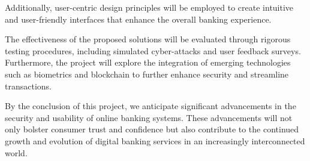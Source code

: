 \documentclass[12pt,a4paper]{report}
\begin{document}
\vspace{0.5cm}
\noindent
Additionally, user-centric design principles will be employed to create
intuitive and user-friendly interfaces that enhance the overall banking
experience.

\vspace{0.5cm}
\noindent
The effectiveness of the proposed solutions will be evaluated through rigorous
testing procedures, including simulated cyber-attacks and user feedback
surveys. Furthermore, the project will explore the integration of emerging
technologies such as biometrics and blockchain to further enhance security and
streamline transactions.

\vspace{0.5cm}
\noindent
By the conclusion of this project, we anticipate significant advancements in
the security and usability of online banking systems. These advancements will
not only bolster consumer trust and confidence but also contribute to the
continued growth and evolution of digital banking services in an increasingly
interconnected world.
\end{document}
